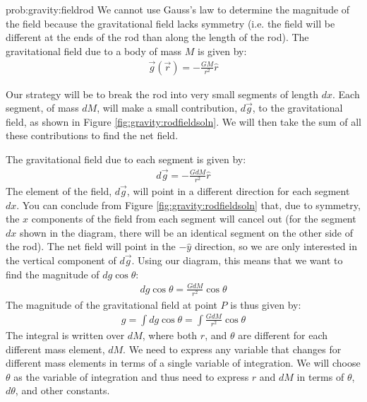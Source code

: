 \begin{solution}{prob:gravity:fieldrod}\label{soln:gravity:fieldrod}
We cannot use Gauss's law to determine the magnitude of the field because the gravitational field lacks symmetry (i.e. the field will be different at the ends of the rod than along the length of the rod). The gravitational field due to a body of mass $M$ is given by:
\begin{align*}
\vec g(\vec r)=-\frac{GM}{r^2}\hat{r}
\end{align*}

Our strategy will be to break the rod into very small segments of length $dx$. Each segment, of mass $dM$, will make a small contribution, $d\vec g$, to the gravitational field, as shown in Figure \ref{fig:gravity:rodfieldsoln}. We will then take the sum of all these contributions to find the net field. 


The gravitational field due to each segment is given by:
\begin{align*}
d\vec g=-\frac{GdM}{r^2}\hat{r}
\end{align*}
The element of the field, $d\vec g$, will point in a different direction for each segment $dx$. You can conclude from Figure \ref{fig:gravity:rodfieldsoln} that, due to symmetry, the $x$ components of the field from each segment will cancel out (for the segment $dx$ shown in the diagram, there will be an identical segment on the other side of the rod). The net field will point in the $-\hat{y}$ direction, so we are only interested in the vertical component of $d\vec g$. Using our diagram, this means that we want to find the magnitude of $dg\cos\theta$: 
\begin{align*}
dg\cos\theta=\frac{G dM}{r^2}\cos\theta
\end{align*}
The magnitude of the gravitational field at point $P$ is thus given by:
\begin{align*}
g = \int dg\cos\theta =\int \frac{G dM}{r^2}\cos\theta
\end{align*}
The integral is written over $dM$, where both $r$, and $\theta$ are different for each different mass element, $dM$. We need to express any variable that changes for different mass elements in terms of a single variable of integration. We will choose $\theta$ as the variable of integration and thus need to express $r$ and $dM$ in terms of $\theta$, $d\theta$, and other constants. 


\end{solution}
